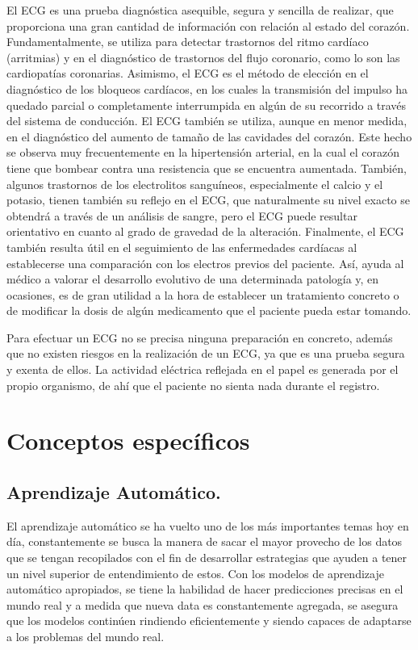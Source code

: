 \documentclass[12pt,letterpaper,oneside,openright]{book}
\begin{document}
El ECG es una prueba diagnóstica asequible, segura y sencilla de realizar, que proporciona una gran cantidad de información con relación al estado del corazón. Fundamentalmente, se utiliza para detectar trastornos del ritmo cardíaco (arritmias) y en el diagnóstico de trastornos del flujo coronario, como lo son las cardiopatías coronarias. Asimismo, el ECG es el método de elección en el diagnóstico de los bloqueos cardíacos, en los cuales la transmisión del impulso ha quedado parcial o completamente interrumpida en algún de su recorrido a través del sistema de conducción. El ECG también se utiliza, aunque en menor medida, en el diagnóstico del aumento de tamaño de las cavidades del corazón. Este hecho se observa muy frecuentemente en la hipertensión arterial, en la cual el corazón tiene que bombear contra una resistencia que se encuentra aumentada. También, algunos trastornos de los electrolitos sanguíneos, especialmente el calcio y el potasio, tienen también su reflejo en el ECG, que naturalmente su nivel exacto se obtendrá a través de un análisis de sangre, pero el ECG puede resultar orientativo en cuanto al grado de gravedad de la alteración. Finalmente, el ECG también resulta útil en el seguimiento de las enfermedades cardíacas al establecerse una comparación con los electros previos del paciente. Así, ayuda al médico a valorar el desarrollo evolutivo de una determinada patología y, en ocasiones, es de gran utilidad a la hora de establecer un tratamiento concreto o de modificar la dosis de algún medicamento que el paciente pueda estar tomando. 

Para efectuar un ECG no se precisa ninguna preparación en concreto, además que no existen riesgos en la realización de un ECG, ya que es una prueba segura y exenta de ellos. La actividad eléctrica reflejada en el papel es generada por el propio organismo, de ahí que el paciente no sienta nada durante el registro. 

\section{Conceptos específicos}

\subsection{Aprendizaje Automático.}
	El aprendizaje automático se ha vuelto uno de los más importantes temas hoy en día, constantemente se busca la manera de sacar el mayor provecho de los datos que se tengan recopilados con el fin de desarrollar estrategias que ayuden a tener un nivel superior de entendimiento de estos. Con los modelos de aprendizaje automático apropiados, se tiene la habilidad de hacer predicciones precisas en el mundo real y a medida que nueva data es constantemente agregada, se asegura que los modelos continúen rindiendo eficientemente y siendo capaces de adaptarse a los problemas del mundo real. 
\end{document}
